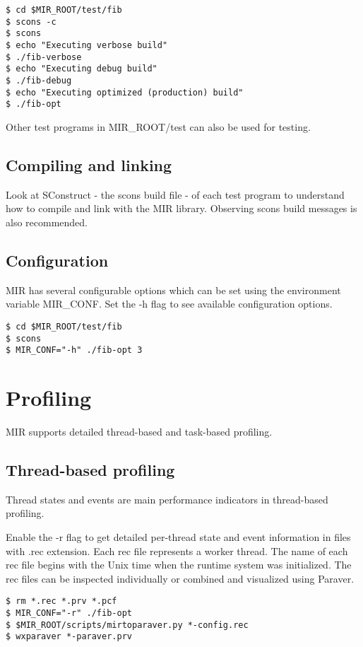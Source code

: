 \documentclass[11pt,a4paper,notitlepage]{article}
\begin{document}
\begin{lstlisting}[style=BashInputStyle]
$ cd $MIR_ROOT/test/fib
$ scons -c
$ scons
$ echo "Executing verbose build"
$ ./fib-verbose
$ echo "Executing debug build"
$ ./fib-debug
$ echo "Executing optimized (production) build"
$ ./fib-opt
\end{lstlisting}

Other test programs in MIR\_ROOT/test can also be used for testing.

\subsection{Compiling and linking}
Look at SConstruct - the scons build file - of each test program to understand how to compile and link with the MIR library. Observing scons build messages is also recommended.

\subsection{Configuration}
MIR has several configurable options which can be set using the environment variable MIR\_CONF. Set the -h flag to see available configuration options.

\begin{lstlisting}[style=BashInputStyle]
$ cd $MIR_ROOT/test/fib
$ scons 
$ MIR_CONF="-h" ./fib-opt 3
\end{lstlisting}

\section{Profiling}
MIR supports detailed thread-based and task-based profiling.

\subsection{Thread-based profiling}
Thread states and events are main performance indicators in thread-based profiling. 

Enable the -r flag to get detailed per-thread state and event information in files with .rec extension.
Each rec file represents a worker thread.
The name of each rec file begins with the Unix time when the runtime system was initialized.
The rec files can be inspected individually or combined and visualized using Paraver.

\begin{lstlisting}[style=BashInputStyle]
$ rm *.rec *.prv *.pcf
$ MIR_CONF="-r" ./fib-opt
$ $MIR_ROOT/scripts/mirtoparaver.py *-config.rec 
$ wxparaver *-paraver.prv
\end{lstlisting}
\end{document}
